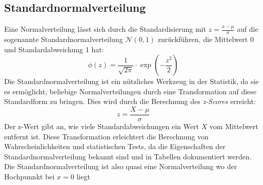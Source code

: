 \subsection{Standardnormalverteilung}
\label{sec:standard_normal_distribution}

Eine Normalverteilung lässt sich durch die Standardisierung mit $z = \frac{x - \mu}{\sigma}$ auf die sogenannte Standardnormalverteilung $\mathcal{N}(0, 1)$ zurückführen, die Mittelwert 0 und Standardabweichung 1 hat:
\[
\phi(z) = \frac{1}{\sqrt{2 \pi}} \cdot \exp\left(-\frac{z^2}{2}\right)
\]
Die Standardnormalverteilung ist ein nützliches Werkzeug in der Statistik, da sie es ermöglicht, beliebige Normalverteilungen durch eine Transformation auf diese Standardform zu bringen. Dies wird durch die Berechnung des \textit{z-Scores} erreicht:
\[
z = \frac{X - \mu}{\sigma}
\]
Der z-Wert gibt an, wie viele Standardabweichungen ein Wert \(X\) vom Mittelwert entfernt ist. Diese Transformation erleichtert die Berechnung von Wahrscheinlichkeiten und statistischen Tests, da die Eigenschaften der Standardnormalverteilung bekannt sind und in Tabellen dokumentiert werden.
Die Standardnormalverteilung ist also quasi eine Normalverteilung wo der Hochpunnkt bei $x=0$ liegt

